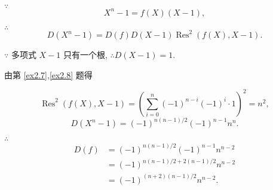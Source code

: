 \documentclass[UTF8]{ctexart}
\begin{document}
\begin{solution}
    $\because$
    \[X^n-1=f(X)(X-1),\]

    $\therefore$
    \[D(X^n-1)=D(f)D(X-1)\operatorname{Res}^2(f(X),X-1).\]

    $\because$ 多项式 $X-1$ 只有一个根, $\therefore D(X-1)=1$.

    由第 \ref{ex2.7},\ref{ex2.8} 题得

    \[\operatorname{Res}^2(f(X),X-1)=\left(\sum\limits_{i=0}^n(-1)^{n-i}(-1)^i\cdot1\right)^2=n^2,\]
    \[D(X^n-1)=(-1)^{n(n-1)/2}(-1)^{n-1}n^n.\]

    $\therefore$
    \begin{align*}
        D(f) & =(-1)^{n(n-1)/2}(-1)^{n-1}n^{n-2} \\
        & =(-1)^{n(n-1)/2+2(n-1)/2}n^{n-2} \\
        & =(-1)^{(n+2)(n-1)/2}n^{n-2}.
    \end{align*}
\end{solution}
\end{document}
